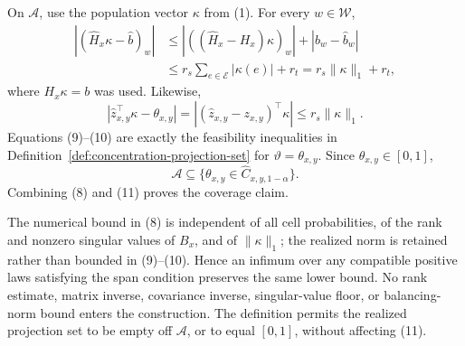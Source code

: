 On \(\mathcal A\), use the population vector \(\kappa\) from (1).  For every \(w\in\mathcal W\),
\[
\begin{aligned}
| (\widehat H_x\kappa-\widehat b)_w |
&\le |((\widehat H_x-H_x)\kappa)_w|+|b_w-\widehat b_w|\\
&\le r_s\sum_{e\in\mathcal E}|\kappa(e)|+r_t
=r_s\lVert\kappa\rVert_1+r_t,
\end{aligned}
\tag{9}
\]
where \(H_x\kappa=b\) was used.  Likewise,
\[
|\widehat z_{x,y}^{\top}\kappa-\theta_{x,y}|
=| (\widehat z_{x,y}-z_{x,y})^{\top}\kappa |
\le r_s\lVert\kappa\rVert_1.
\tag{10}
\]
Equations (9)--(10) are exactly the feasibility inequalities in Definition~\ref{def:concentration-projection-set} for \(\vartheta=\theta_{x,y}\).  Since \(\theta_{x,y}\in[0,1]\),
\[
\mathcal A\subseteq
\{\theta_{x,y}\in\widehat C_{x,y,1-\alpha}\}.
\tag{11}
\]
Combining (8) and (11) proves the coverage claim.

The numerical bound in (8) is independent of all cell probabilities, of the rank and nonzero singular values of \(B_x\), and of \(\lVert\kappa\rVert_1\); the realized norm is retained rather than bounded in (9)--(10).  Hence an infimum over any compatible positive laws satisfying the span condition preserves the same lower bound.  No rank estimate, matrix inverse, covariance inverse, singular-value floor, or balancing-norm bound enters the construction.  The definition permits the realized projection set to be empty off \(\mathcal A\), or to equal \([0,1]\), without affecting (11).
